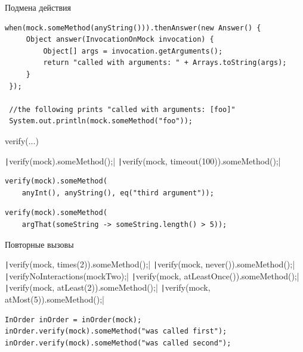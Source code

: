 \documentclass{../../slides-style}
\begin{document}
    \begin{frame}[fragile]{Подмена действия}
        \begin{verbatim}
when(mock.someMethod(anyString())).thenAnswer(new Answer() {
     Object answer(InvocationOnMock invocation) {
         Object[] args = invocation.getArguments();
         return "called with arguments: " + Arrays.toString(args);
     }
 });
 
 //the following prints "called with arguments: [foo]"
 System.out.println(mock.someMethod("foo"));
        \end{verbatim}
    \end{frame}

    \begin{frame}[fragile]{verify(...)}
        \begin{outline}
            \1 \texttt|verify(mock).someMethod();|
            \1 \texttt|verify(mock, timeout(100)).someMethod();|
            \1 
                \begin{verbatim}
verify(mock).someMethod(
    anyInt(), anyString(), eq("third argument"));
                \end{verbatim}
            \1 
                \begin{verbatim}
verify(mock).someMethod(
    argThat(someString -> someString.length() > 5));
                \end{verbatim}
        \end{outline}
    \end{frame}

    \begin{frame}[fragile]{Повторные вызовы}
        \begin{outline}
            \1 \texttt|verify(mock, times(2)).someMethod();|
            \1 \texttt|verify(mock, never()).someMethod();|
                \2 \texttt|verifyNoInteractions(mockTwo);|
            \1 \texttt|verify(mock, atLeastOnce()).someMethod();|
            \1 \texttt|verify(mock, atLeast(2)).someMethod();|
            \1 \texttt|verify(mock, atMost(5)).someMethod();|
            \1 
                \begin{verbatim}
InOrder inOrder = inOrder(mock);
inOrder.verify(mock).someMethod("was called first");
inOrder.verify(mock).someMethod("was called second");
                \end{verbatim}
        \end{outline}
    \end{frame}
\end{document}

